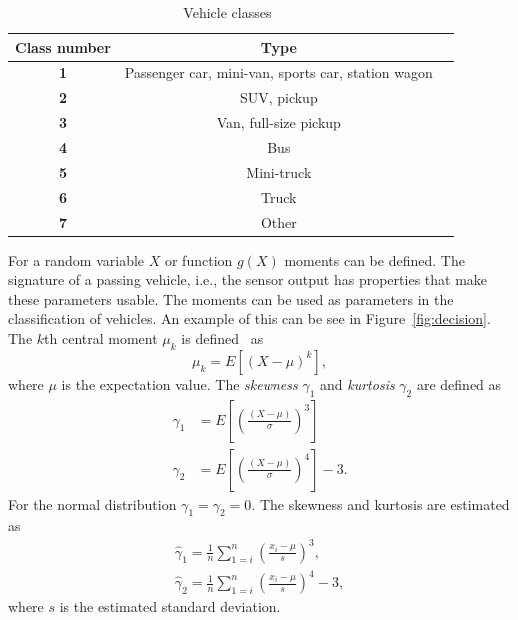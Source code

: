 \begin{table}[htb]
 \centering
 \caption[Vehicle classes]{Vehicle classes~\cite{sun2000}}
 \label{tbl:classes}
 \begin{tabular}{ccl}\toprule
 \textbf{Class number} & \textbf{Type}\\ \midrule
 \textbf{1} & Passenger car, mini-van, sports car, station wagon\\
 \textbf{2} & SUV, pickup\\
 \textbf{3} & Van, full-size pickup\\
 \textbf{4} & Bus\\
 \textbf{5} & Mini-truck\\
 \textbf{6} & Truck\\
 \textbf{7} & Other\\\bottomrule
 \end{tabular}
\end{table}


For a random variable $X$ or function $g(X)$ moments can be defined. The signature of a passing vehicle, i.e., the sensor output has properties that make these parameters usable. The moments can be used as parameters in the classification of vehicles. An example of this can be see in \mbox{Figure~\ref{fig:decision}}. The $k$th central moment $\mu_k$ is defined~\cite{Raade:1995:MHS} as
\begin{equation}
\mu_k = E[(X-\mu)^k],
\end{equation}
where $\mu$ is the expectation value. The \emph{skewness} $\gamma_1$ and \emph{kurtosis} $\gamma_2$ are defined as
\begin{align}
 	\gamma_1 &= E\left[\left(\frac{(X-\mu)}{\sigma}\right)^3\right]\\
 	\gamma_2 &= E\left[\left(\frac{(X-\mu)}{\sigma}\right)^4\right]-3.
\end{align}
For the normal distribution $\gamma_1 = \gamma_2 = 0$. The skewness and kurtosis are estimated as
\begin{align}
 \hat{\gamma}_1 = \frac{1}{n}\sum_{1=i}^n\left(\frac{x_i-\mu}{s}\right)^3,\\
 \hat{\gamma}_2 = \frac{1}{n}\sum_{1=i}^n\left(\frac{x_i-\mu}{s}\right)^4-3,
\end{align}
where $s$ is the estimated standard deviation.

